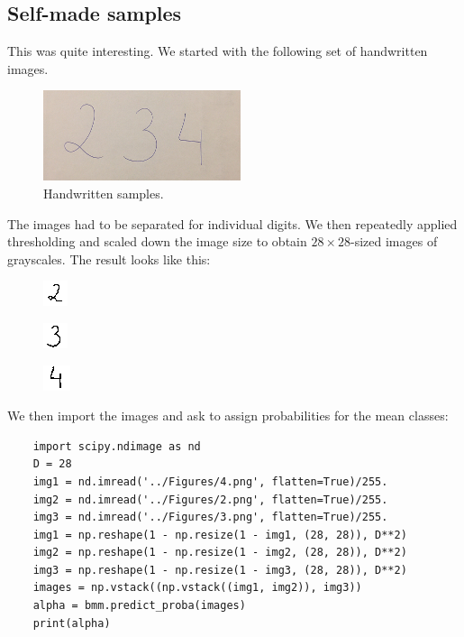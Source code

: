 \subsection{Self-made samples}
This was quite interesting. We started with the following set of handwritten images.
\begin{figure}[H]
	\centering \includegraphics{../Figures/sample_orig.jpg}
	\caption{Handwritten samples.}
	\label{fig:45_handwritten}
\end{figure}
The images had to be separated for individual digits. We then repeatedly applied thresholding and scaled down the image size to obtain $28\times 28$-sized images of grayscales. The result looks like this:
\begin{center}
	\begin{minipage}[t]{0.3\textwidth}
    	\begin{figure}[H]
            \includegraphics{../Figures/2.png}
    	\end{figure}
	\end{minipage}
	\begin{minipage}[t]{0.3\textwidth}
    	\begin{figure}[H]
            \includegraphics{../Figures/3.png}
    	\end{figure}
	\end{minipage}
	\begin{minipage}[t]{0.3\textwidth}
    	\begin{figure}[H]
            \includegraphics{../Figures/4.png}
    	\end{figure}
	\end{minipage}
\end{center}

We then import the images and ask to assign probabilities for the mean classes:
\begin{verbatim}
    import scipy.ndimage as nd
    D = 28
    img1 = nd.imread('../Figures/4.png', flatten=True)/255.
    img2 = nd.imread('../Figures/2.png', flatten=True)/255.
    img3 = nd.imread('../Figures/3.png', flatten=True)/255.
    img1 = np.reshape(1 - np.resize(1 - img1, (28, 28)), D**2)
    img2 = np.reshape(1 - np.resize(1 - img2, (28, 28)), D**2)
    img3 = np.reshape(1 - np.resize(1 - img3, (28, 28)), D**2)
    images = np.vstack((np.vstack((img1, img2)), img3))
    alpha = bmm.predict_proba(images)
    print(alpha)
\end{verbatim}

